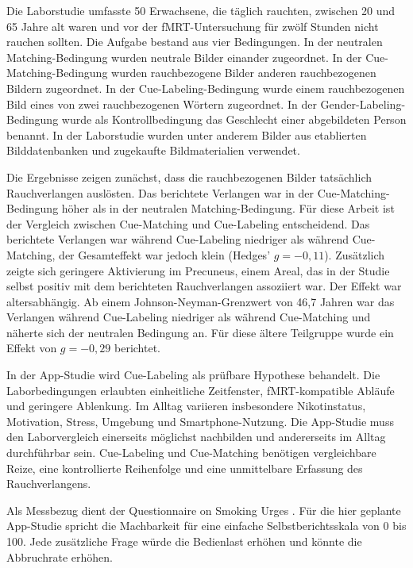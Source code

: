 Die Laborstudie umfasste 50 Erwachsene, die täglich rauchten, zwischen 20 und 65 Jahre alt waren und vor der fMRT-Untersuchung für zwölf Stunden nicht rauchen sollten. Die Aufgabe bestand aus vier Bedingungen. In der neutralen Matching-Bedingung wurden neutrale Bilder einander zugeordnet. In der Cue-Matching-Bedingung wurden rauchbezogene Bilder anderen rauchbezogenen Bildern zugeordnet. In der Cue-Labeling-Bedingung wurde einem rauchbezogenen Bild eines von zwei rauchbezogenen Wörtern zugeordnet. In der Gender-Labeling-Bedin\-gung wurde als Kontrollbedingung das Geschlecht einer abgebildeten Person benannt. In der Laborstudie wurden unter anderem Bilder aus etablierten Bilddatenbanken und zugekaufte Bildmaterialien verwendet. \\
\cite{tabibnia_cuelabeling_2026}

Die Ergebnisse zeigen zunächst, dass die rauchbezogenen Bilder tatsächlich Rauchverlangen auslösten. Das berichtete Verlangen war in der Cue-Matching-Bedingung höher als in der neu\-tralen Matching-Bedingung. Für diese Arbeit ist der Vergleich zwischen Cue-Matching und Cue-Labeling entscheidend. Das berichtete Verlangen war während Cue-Labeling niedriger als wäh\-rend Cue-Matching, der Gesamteffekt war jedoch klein (Hedges' \(g=-0{,}11\)). Zusätzlich zeigte sich geringere Aktivierung im Precuneus, einem Areal, das in der Studie selbst positiv mit dem berichteten Rauchverlangen assoziiert war. Der Effekt war altersabhängig. Ab einem Johnson-Neyman-Grenzwert von 46,7 Jahren war das Verlangen während Cue-Labeling niedriger als während Cue-Matching und näherte sich der neutralen Bedingung an. Für diese ältere Teilgruppe wurde ein Effekt von \(g=-0{,}29\) berichtet.\\
\cite{tabibnia_cuelabeling_2026}

In der App-Studie wird Cue-Labeling als prüfbare Hypothese behandelt. Die Laborbedingungen erlaubten einheitliche Zeitfenster, fMRT-kompatible Abläufe und geringere Ablenkung. Im Alltag variieren insbesondere Nikotinstatus, Motivation, Stress, Umgebung und Smartphone-Nutzung. Die App-Studie muss den Laborvergleich einerseits möglichst nachbilden und andererseits im Alltag durchführbar sein. Cue-Labeling und Cue-Matching benötigen vergleichbare Reize, eine kontrollierte Reihenfolge und eine unmittelbare Erfassung des Rauchverlangens.

Als Messbezug dient der Questionnaire on Smoking Urges \cite{addiction_research_center_qsu}. Für die hier geplante App-Studie spricht die Machbarkeit für eine einfache Selbstberichtsskala von 0 bis 100. Jede zusätzliche Frage würde die Bedienlast erhöhen und könnte die Abbruchrate erhöhen. 

